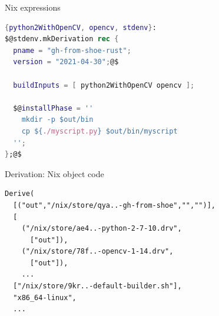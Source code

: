 \documentclass[aspectratio=169]{beamer}
\begin{document}
\begin{frame}[fragile]{Nix expressions}
\begin{lstlisting}[language=Nix,title={gh-from-shoe/default.nix}]
{python2WithOpenCV, opencv, stdenv}:
$@stdenv.mkDerivation rec {
  pname = "gh-from-shoe-rust";
  version = "2021-04-30";@$

  buildInputs = [ python2WithOpenCV opencv ];

  $@installPhase = ''
    mkdir -p $out/bin
    cp ${./myscript.py} $out/bin/myscript
  '';
};@$
\end{lstlisting}
\end{frame}

\begin{frame}[fragile]{Derivation: Nix object code}
\begin{lstlisting}[title={/nix/store/27az7...gh-from-shoe-1-0.drv}]
Derive(
  [("out","/nix/store/qya..-gh-from-shoe","","")],
  [
    ("/nix/store/ae4..-python-2-7-10.drv",
      ["out"]),
    ("/nix/store/78f..-opencv-1-14.drv",
      ["out"]),
    ...
  ["/nix/store/9kr..-default-builder.sh"],
  "x86_64-linux",
  ...
\end{lstlisting}
\end{frame}
\end{document}
